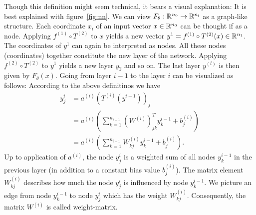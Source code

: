 Though this definition might seem technical, it bears a visual explanation:
It is best explained with figure~\ref{fig:nn}. We can view $F_\theta:\mathbb{R}^{n_0}\to\mathbb{R}^{n_l}$ as a graph-like structure. Each coordinate $x_i$ 
of an input vector $x\in\mathbb{R}^{n_0}$ can be thought if as a node. Applying $f^{(1)}\circ T^{(2)}$ to $x$ yields a
new vector $y^1=f^{(1)}\circ T^{(2)}(x)\in\mathbb{R}^{n_1}$. The coordinates of $y^1$ can again be interpreted as nodes. All these nodes (coordinates) together constitute the new layer
of the network. Applying $f^{(2)}\circ T^{(2)}$ to $y^1$ yields a new layer $y_2$ and so on. The last layer $y^{(l)}$ is then given by $F_\theta(x)$.
Going from layer $i-1$ to the layer $i$ can be visualized as follows: According to the above definitinos we have
\begin{align*}
    y^{i}_j&=a^{(i)}\left(T^{(i)}\left(y^{i-1}\right)\right)_j\\
    &=a^{(i)}\left(\sum_{k=1}^{n_{i-1}}\left(W^{(i)}\right)^T_{jk}y^{i-1}_k+b^{(i)}_j\right)\\
    &=a^{(i)}\left(\sum_{k=1}^{n_{i-1}}W^{(i)}_{kj}y^{i-1}_k+b^{(i)}_j\right).
\end{align*}
Up to application of $a^{(i)}$, the node $y^i_j$ is a weighted sum of all nodes $y^{i-1}_k$ in the previous layer (in addition to a constant bias value $b^{(i)}_j$).
The matrix element $W^{(i)}_{kj}$ describes how much the node $y^i_j$ is influenced by node $y^{i-1}_k$. 
We picture an edge from node $y^{i-1}_k$ to node $y^i_j$ which has the weight $W^{(i)}_{kj}$. Consequently, the matrix $W^{(i)}$ is called weight-matrix.
